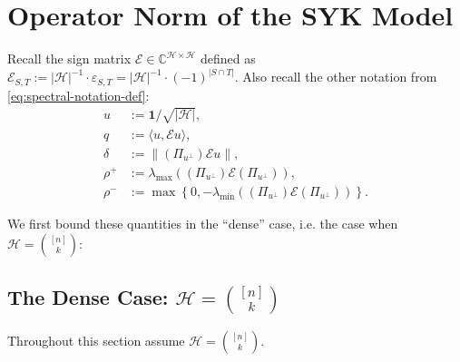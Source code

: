 \documentclass
[11pt,letterpaper]
{article}
\theoremstyle{definition}
\newcommand{\eps}{\varepsilon}
\newcommand{\cE}{{\mathcal E}}
\newcommand{\1}{\mathbf{1}}
\newcommand{\C}{\mathbb C}
\newcommand{\cH}{\mathcal H}
\begin{document}
\section{Operator Norm of the SYK Model}
Recall the sign matrix $\cE\in\C^{\cH\times\cH}$ defined as $\cE_{S, T}:= |\cH|^{-1}\cdot\eps_{S, T} = |\cH|^{-1}\cdot(-1)^{|S\cap T|}$. Also recall the other notation from \cref{eq:spectral-notation-def}:
\begin{align*}
u&:= \1/\sqrt{|\cH|},\\
q&:=\langle u,\cE u\rangle,\\
\delta&:=\|(\Pi_{u^\perp})\cE u\|,\\
\rho^+&:=\lambda_{\max}\!\left((\Pi_{u^\perp})\cE(\Pi_{u^\perp})\right),\\
\rho^-&:=\max\left\{0, -\lambda_{\min}\!\left((\Pi_{u^\perp})\cE(\Pi_{u^\perp})\right)\right\}.
\end{align*}

We first bound these quantities in the ``dense'' case, i.e. the case when $\cH = \binom{[n]}{k}$:
\subsection[The Dense Case]{The Dense Case: $\cH = \binom{[n]}{k}$}
Throughout this section assume $\cH = \binom{[n]}{k}$. 
\end{document}
